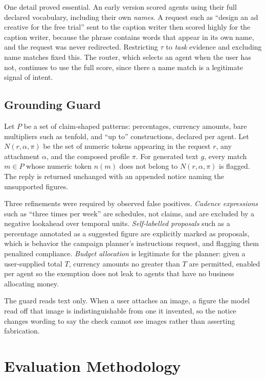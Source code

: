 \documentclass[9pt,twocolumn]{extarticle}
\begin{document}
One detail proved essential. An early version scored agents using their full
declared vocabulary, including their own \textit{names}. A request such as
``design an ad creative for the free trial'' sent to the caption writer then
scored highly for the caption writer, because the phrase contains words that
appear in its own name, and the request was never redirected. Restricting
$\tau$ to \textit{task} evidence and excluding name matches fixed this. The
router, which selects an agent when the user has not, continues to use the full
score, since there a name match is a legitimate signal of intent.

\subsection{Grounding Guard}
Let $P$ be a set of claim-shaped patterns: percentages, currency amounts, bare
multipliers such as tenfold, and ``up to'' constructions, declared per agent.
Let $N(r, \alpha, \pi)$ be the set of numeric tokens appearing in the request
$r$, any attachment $\alpha$, and the composed profile $\pi$. For generated
text $g$, every match $m \in P$ whose numeric token $n(m)$ does not belong to
$N(r,\alpha,\pi)$ is flagged. The reply is returned unchanged with an appended
notice naming the unsupported figures.

Three refinements were required by observed false positives.
\textit{Cadence expressions} such as ``three times per week'' are schedules,
not claims, and are excluded by a negative lookahead over temporal units.
\textit{Self-labelled proposals} such as a percentage annotated as a suggested
figure are explicitly marked as proposals, which is behavior the campaign
planner's instructions request, and flagging them penalized compliance.
\textit{Budget allocation} is legitimate for the planner: given a user-supplied
total $T$, currency amounts no greater than $T$ are permitted, enabled per
agent so the exemption does not leak to agents that have no business
allocating money.

The guard reads text only. When a user attaches an image, a figure the model
read off that image is indistinguishable from one it invented, so the notice
changes wording to say the check cannot see images rather than asserting
fabrication.

\section{Evaluation Methodology}
\end{document}

